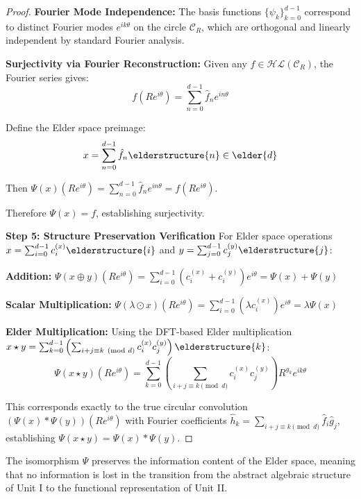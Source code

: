 \begin{proof}
\textbf{Fourier Mode Independence:} The basis functions $\{\psi_k\}_{k=0}^{d-1}$ correspond to distinct Fourier modes $e^{ik\theta}$ on the circle $\mathcal{C}_R$, which are orthogonal and linearly independent by standard Fourier analysis.

\textbf{Surjectivity via Fourier Reconstruction:}
Given any $f \in \mathcal{HL}(\mathcal{C}_R)$, the Fourier series gives:
$$f(Re^{i\theta}) = \sum_{n=0}^{d-1} \hat{f}_n e^{in\theta}$$

Define the Elder space preimage:
$$x = \sum_{n=0}^{d-1} \hat{f}_n \elderstructure{n} \in \elder{d}$$

Then $\Psi(x)(Re^{i\theta}) = \sum_{n=0}^{d-1} \hat{f}_n e^{in\theta} = f(Re^{i\theta})$.

Therefore $\Psi(x) = f$, establishing surjectivity.

\textbf{Step 5: Structure Preservation Verification}
For Elder space operations $x = \sum_{i=0}^{d-1} c_i^{(x)} \elderstructure{i}$ and $y = \sum_{j=0}^{d-1} c_j^{(y)} \elderstructure{j}$:

\textbf{Addition:} $\Psi(x \oplus y)(Re^{i\theta}) = \sum_{i=0}^{d-1} (c_i^{(x)} + c_i^{(y)}) e^{i\theta} = \Psi(x) + \Psi(y)$

\textbf{Scalar Multiplication:} $\Psi(\lambda \odot x)(Re^{i\theta}) = \sum_{i=0}^{d-1} (\lambda c_i^{(x)}) e^{i\theta} = \lambda \Psi(x)$

\textbf{Elder Multiplication:} Using the DFT-based Elder multiplication $x \star y = \sum_{k=0}^{d-1} \left(\sum_{i+j \equiv k \pmod{d}} c_i^{(x)} c_j^{(y)}\right) \elderstructure{k}$:
$$\Psi(x \star y)(Re^{i\theta}) = \sum_{k=0}^{d-1} \left(\sum_{i+j \equiv k \pmod{d}} c_i^{(x)} c_j^{(y)}\right) R^{g_k} e^{ik\theta}$$

This corresponds exactly to the true circular convolution $(\Psi(x) * \Psi(y))(Re^{i\theta})$ with Fourier coefficients $\hat{h}_k = \sum_{i+j \equiv k \pmod{d}} \hat{f}_i \hat{g}_j$, establishing $\Psi(x \star y) = \Psi(x) * \Psi(y)$.
\end{proof}

\begin{corollary}
\label{cor:information_preservation}
The isomorphism $\Psi$ preserves the information content of the Elder space, meaning that no information is lost in the transition from the abstract algebraic structure of Unit I to the functional representation of Unit II.
\end{corollary}

